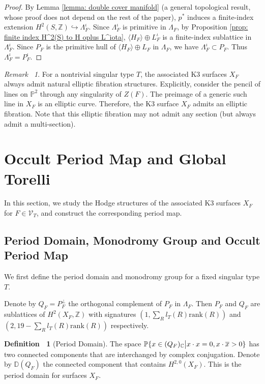 \documentclass[12pt,reqno,a4paper]{amsart}
\theoremstyle{remark}
\newtheorem{rmk}[thm]{Remark~}
\theoremstyle{definition}
\newtheorem{defn}[thm]{Definition~}
\begin{document}
\begin{proof}
    By Lemma \ref{lemma: double cover manifold} (a general topological result, whose proof does not depend on the rest of the paper), $p^*$ induces a finite-index extension $H^2(S,\mathbb{Z})\hookrightarrow \Lambda_F^\iota$.
    Since $\Lambda_F^\iota$ is primitive in $\Lambda_F$, by Proposition \ref{prop: finite index H^2(S) to H oplus L^iota}, $\langle H_F \rangle\oplus L_F^{\iota}$ is a finite-index sublattice in $\Lambda_F^\iota$.
    Since $P_F$ is the primitive hull of $\langle H_F \rangle\oplus L_F$ in $\Lambda_F$, we have $\Lambda_F^\iota\subset P_F$.
    Thus $\Lambda_F^\iota = P_F^\iota$.
\end{proof}

\begin{rmk}
For a nontrivial singular type $T$, the associated K3 surfaces $X_F$ always admit natural elliptic fibration structures.
Explicitly, consider the pencil of lines on $\mathbb{P}^2$ through any singularity of $Z(F)$. The preimage of a generic such line in $X_F$ is an elliptic curve. Therefore, the K3 surface $X_F$ admits an elliptic fibration. Note that this elliptic fibration may not admit any section (but always admit a multi-section).
\end{rmk}


\section{Occult Period Map and Global Torelli}
\label{section: period map}
In this section, we study the Hodge structures of the associated K3 surfaces $X_F$ for $F\in\mathcal{V}_T$, and construct the corresponding period map.

\subsection{Period Domain, Monodromy Group and Occult Period Map}
\label{subsection: define period map}
We first define the period domain and monodromy group for a fixed singular type $T$.


Denote by $Q_F=P_F^\perp$ the orthogonal complement of $P_F$ in $\Lambda_F$. Then $P_F$ and $Q_F$ are sublattices of $H^2(X_F,\mathbb{Z})$ with signatures $(1,\sum_R l_{T}(R)\mathrm{rank}(R))$ and $(2,19-\sum_R l_{T}(R)\mathrm{rank}(R))$ respectively. 

\begin{defn}[Period Domain]
\label{defn: period domain}
The space $\mathbb{P}\{x\in (Q_F)_\mathbb{C} \big{|} x\cdot x=0, x\cdot \overline{x}>0 \}$ has two connected components that are interchanged by complex conjugation. Denote by $\mathbb{D}(Q_F)$ the connected component that contains $H^{2,0}(X_F)$. This is the period domain for surfaces $X_F$.
\end{defn}
\end{document}
